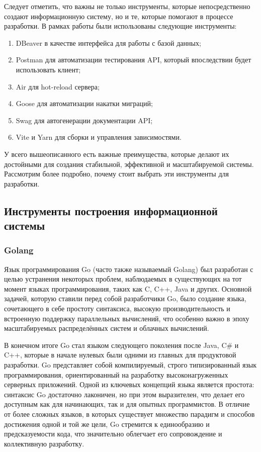 \documentclass[diploma]{SCWorks}
\begin{document}
Следует отметить, что важны не только инструменты, которые непосредственно 
создают информационную систему, но и те, которые помогают в процессе разработки.
В рамках работы были использованы следующие инструменты:
\begin{enumerate}
    \item DBeaver в качестве интерфейса для работы с базой данных;
    \item Postman для автоматизации тестирования API, который впоследствии будет
    использовать клиент;
    \item Air для hot-reload сервера;
    \item Goose для автоматизации накатки миграций;
    \item Swag для автогенерации документации API;
    \item Vite и Yarn для сборки и управления зависимостями.
\end{enumerate}

У всего вышеописанного есть важные преимущества, которые делают 
их достойными для создания стабильной, эффективной и масштабируемой системы. 
Рассмотрим более подробно, почему стоит выбрать эти инструменты для разработки.

\subsection{Инструменты построения информационной системы}

\subsubsection{Golang}

Язык программирования Go (часто также называемый Golang) был разработан 
с целью устранения некоторых проблем, наблюдаемых в 
существующих на тот момент языках программирования, таких как C, C++, Java 
и других. Основной задачей, которую ставили перед собой разработчики Go, 
было создание языка, сочетающего в себе простоту синтаксиса, высокую 
производительность и встроенную поддержку параллельных вычислений, что 
особенно важно в эпоху масштабируемых распределённых систем и облачных 
вычислений.

В конечном итоге Go стал языком следующего поколения после Java, C\# и C++, 
которые в начале нулевых были одними из главных для продуктовой разработки. 
Go представляет собой компилируемый, строго типизированный язык 
программирования, ориентированный на разработку высоконагруженных серверных 
приложений. Одной из ключевых концепций языка является простота: синтаксис 
Go достаточно лаконичен, но при этом выразителен, что делает его доступным 
как для начинающих, так и для опытных программистов. В отличие от более 
сложных языков, в которых существует множество парадигм и способов достижения 
одной и той же цели, Go стремится к единообразию и предсказуемости кода, 
что значительно облегчает его сопровождение и коллективную разработку.
\end{document}

